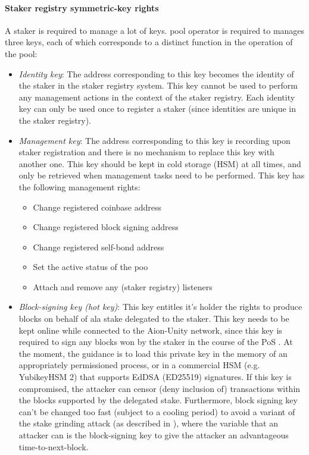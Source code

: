 \paragraph{Staker registry symmetric-key rights} \label{km_staker} A staker is required to manage a lot of keys. pool operator is required to manages three keys, each of which corresponds to a distinct function in the operation of the pool: 
\begin{itemize}
    \item \textit{Identity key}: The address corresponding to this key becomes the identity of the staker in the staker registry system. This key cannot be used to perform any management actions in the context of the staker registry. Each identity key can only be used once to register a staker (since identities are unique in the staker registry). 
    
    \item \textit{Management key}: The address corresponding to this key is recording upon staker registration and there is no mechanism to replace this key with another one. This key should be kept in cold storage (HSM) at all times, and only be retrieved when management tasks need to be performed. This key has the following management rights:
    \begin{itemize} [label=--,nosep]
        \item Change registered coinbase address
        \item Change registered block signing address
        \item Change registered self-bond address
        \item Set the active status of the poo
        \item Attach and remove any (staker registry) listeners 
    \end{itemize}
    
    \item \textit{Block-signing key (hot key)}: This key entitles it's holder the rights to produce blocks on behalf of ala stake delegated to the staker. This key needs to be kept online while connected to the Aion-Unity network, since this key is required to sign any blocks won by the staker in the course of the PoS . At the moment, the guidance is to load this private key in the memory of an appropriately permissioned process, or in a commercial HSM (e.g. YubikeyHSM 2) that supports EdDSA (ED25519) signatures. If this key is compromised, the attacker can censor (deny inclusion of) transactions within the blocks supported by the delegated stake. Furthermore, block signing key can't be changed too fast (subject to a cooling period) to avoid a variant of the stake grinding attack (as described in \cite{WZS19}), where the variable that an attacker can  is the block-signing key to give the attacker an advantageous time-to-next-block. 
    

\end{itemize}
